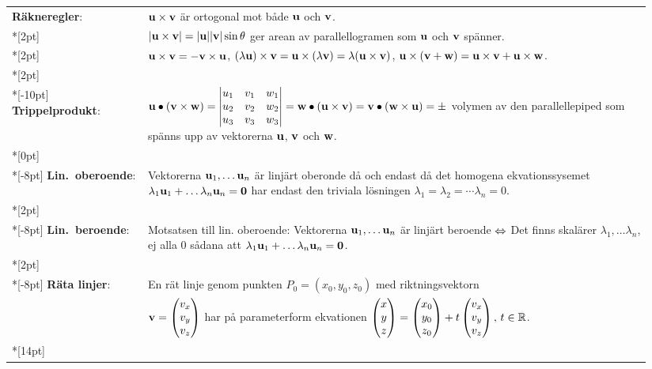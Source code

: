\documentclass{article}
\begin{document}
\begin{tabular}{|p{0.2\linewidth}|p{0.745\linewidth}|}
  \textbf{Räkneregler}:
  &
  ${\mathbf u}\times{\mathbf v}$ är ortogonal mot både ${\mathbf u}$ och ${\mathbf v}$.
  \\*[2pt]
  &$|{\mathbf u}\times{\mathbf v}|=|{\mathbf u}||{\mathbf v}|\sin\theta$ 
  ger
  arean av parallellogramen som ${\mathbf u}$ och ${\mathbf v}$ spänner.
  \\*[2pt]
  &${\mathbf u}\times{\mathbf v}=-{\mathbf v}\times {\mathbf u}$, 
  $(\lambda {\mathbf u})\times{\mathbf v}={\mathbf u}\times(\lambda {\mathbf v})=\lambda ({\mathbf u}\times{\mathbf v})$, 
  ${\mathbf u}\times({\mathbf v}+{\mathbf w})={\mathbf u}\times{\mathbf v}+{\mathbf u}\times{\mathbf w}$.
  \\*[2pt] \hline & \\*[-10pt]
  \textbf{Trippelprodukt}:
  &
  $
  {\mathbf u}\bullet({\mathbf v}\times{\mathbf w})=
  \begin{vmatrix}
    u_1&v_1&w_1\\
    u_2&v_2&w_2\\
    u_3&v_3&w_3
  \end{vmatrix}
  = {\mathbf w}\bullet({\mathbf u}\times{\mathbf v})
  = {\mathbf v}\bullet({\mathbf w}\times{\mathbf u})
  = \pm $ volymen av den parallellepiped som spänns upp av vektorerna
  ${\mathbf u}$, ${\mathbf v}$ och ${\mathbf w}$.\\*[0pt]
  \hline
  &
  \\*[-8pt]
  \textbf{Lin.~oberoende}: 
  & 
  Vektorerna ${\mathbf u}_1,\dots{\mathbf u}_n$ är linjärt 
  oberonde då och endast då det homogena ekvationssysemet
  $\lambda_1{\mathbf u}_1+\dots\lambda_n{\mathbf u}_n={\mathbf 0}$
  har endast den triviala lösningen
  $\lambda_1=\lambda_2=\cdots\lambda_n=0$.
  \\*[2pt]
  \hline
  &\\*[-8pt]
  \textbf{Lin.~beroende}: 
  &
  Motsatsen till lin. oberoende: 
  Vektorerna ${\mathbf u}_1,\dots{\mathbf u}_n$ är
  linjärt beroende $\Leftrightarrow$ Det finns skalärer $\lambda_1,\dots\lambda_n$,
  ej alla 0 sådana att $\lambda_1{\mathbf u}_1+\dots\lambda_n{\mathbf u}_n=\mathbf 0$.
  \\*[2pt] \hline &\\*[-8pt]
  \textbf{Räta linjer}: 
  &
  En rät linje genom punkten $P_0=(x_0,y_0,z_0)$ med
  riktningsvektorn\\
  &$\bdv=\trevektor[v_x,v_y,v_z]$ har på parameterform ekvationen 
  $\trevektor[x,y,z]=\trevektor[x_0,y_0,z_0]+t\trevektor[v_x,v_y,v_z],\,
  t\in\mathbb R$.
  \\*[14pt] \hline
\end{tabular}%
\end{document}
